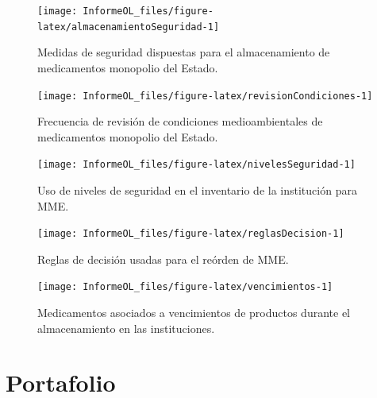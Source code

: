 \documentclass[
  oneside]{book}
\begin{document}
\begin{figure}

{\centering \texttt{[image: InformeOL\_files/figure-latex/almacenamientoSeguridad-1]} 

}

\caption{Medidas de seguridad dispuestas para el almacenamiento de medicamentos monopolio del Estado.}\label{fig:almacenamientoSeguridad}
\end{figure}

\begin{figure}

{\centering \texttt{[image: InformeOL\_files/figure-latex/revisionCondiciones-1]} 

}

\caption{Frecuencia de revisión de condiciones medioambientales de medicamentos monopolio del Estado.}\label{fig:revisionCondiciones}
\end{figure}

\begin{figure}

{\centering \texttt{[image: InformeOL\_files/figure-latex/nivelesSeguridad-1]} 

}

\caption{Uso de niveles de seguridad en el inventario de la institución para MME.}\label{fig:nivelesSeguridad}
\end{figure}

\begin{figure}

{\centering \texttt{[image: InformeOL\_files/figure-latex/reglasDecision-1]} 

}

\caption{Reglas de decisión usadas para el reórden de MME.}\label{fig:reglasDecision}
\end{figure}

\begin{figure}

{\centering \texttt{[image: InformeOL\_files/figure-latex/vencimientos-1]} 

}

\caption{Medicamentos asociados a vencimientos de productos durante el almacenamiento en las instituciones.}\label{fig:vencimientos}
\end{figure}

\hypertarget{portafolio}{%
\chapter{Portafolio}\label{portafolio}}
\end{document}

